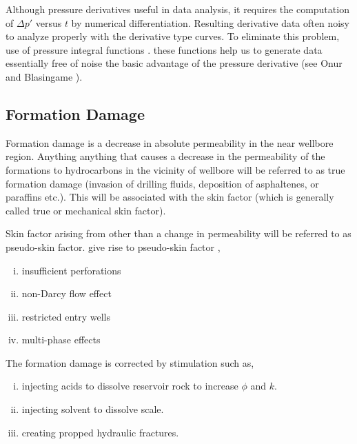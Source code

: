 \documentclass{llncs}
\numberwithin{equation}{section}
\numberwithin{figure}{section}
\numberwithin{table}{section}
\begin{document}
    Although pressure derivatives  useful in data analysis, it requires the computation of $\Delta p'$ versus $t$ by numerical differentiation. Resulting derivative data  often noisy to analyze properly with the derivative type curves. To eliminate this problem, use of pressure integral functions .  these functions help us to generate data essentially free of noise  the basic advantage of the pressure derivative (see Onur \cite{Onur_1989_2} and Blasingame \cite{Blasingame_1989_1}).

    \subsection{Formation Damage}
    Formation damage is a decrease in absolute permeability in the near wellbore region. Anything anything that causes a decrease in the permeability of the formations to hydrocarbons in the vicinity of wellbore will be referred to as true formation damage (invasion of drilling fluids, deposition of asphaltenes, or paraffins etc.). This will be associated with the skin factor (which is generally called true or mechanical skin factor).

    Skin factor arising from other than a change in permeability will be referred to as pseudo-skin factor.  give rise to pseudo-skin factor ,

    \begin{enumerate}[(i)]
        \item   insufficient perforations
        \item   non-Darcy flow effect
        \item   restricted entry wells
        \item   multi-phase effects
    \end{enumerate}

    The formation damage is corrected by stimulation such as,

    \begin{enumerate}[(i)]
        \item   injecting acids to dissolve reservoir rock to increase $\phi$ and $k$.
        \item   injecting solvent to dissolve scale.
        \item   creating propped hydraulic fractures.
    \end{enumerate}
\end{document}
